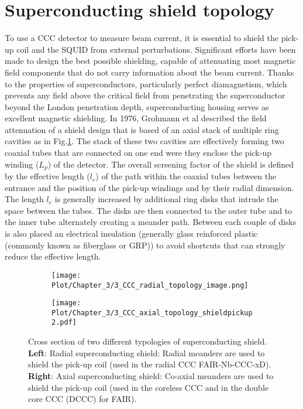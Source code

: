 \documentclass[12pt,a4paper]{report}
\begin{document}
        \section{Superconducting shield topology}
        To use a CCC detector to measure beam current, it is essential to shield the pick-up coil and the SQUID from external perturbations. Significant efforts have been made to design the best possible shielding, capable of attenuating most magnetic field components that do not carry information about the beam current. Thanks to the properties of superconductors, particularly perfect diamagnetism, which prevents any field above the critical field from penetrating the superconductor beyond the London penetration depth, superconducting housing serves as excellent magnetic shielding. In 1976, Grohmann et al \cite{GROHMANN_CCC} described the field attenuation of a shield design that is based of an axial stack of multiple ring cavities as in Fig.\ref{CH3_shield_topology}. The stack of these two cavities are effectively forming two coaxial tubes that are connected on one end were they enclose the pick-up winding ($L_p$) of the detector. The overall screening factor of the shield is defined by the effective length ($l_e$) of the path within the coaxial tubes between the entrance and the position of the pick-up windings and by their radial dimension. The length $l_e$ is generally increased by additional ring disks that intrude the space between the tubes. The disks are then connected to the outer tube and to the inner tube alternately creating a meander path. Between each couple of disks is also placed an electrical insulation (generally glass reinforced plastic (commonly known as fiberglass or GRP)) to avoid shortcuts that can strongly reduce the effective length.
        \begin{figure}[H]
        	\centering
        	\begin{subfigure}[b]{0.45\textwidth}
        		\centering
        		\texttt{[image: Plot/Chapter\_3/3\_CCC\_radial\_topology\_image.png]}
        	\end{subfigure}
        	\hfill
        	\begin{subfigure}[b]{0.45\textwidth}
        		\centering
        		\texttt{[image: Plot/Chapter\_3/3\_CCC\_axial\_topology\_shieldpickup2.pdf]}
        	\end{subfigure}
        	\caption{ Cross section of two different typologies of superconducting shield. \\ \textbf{Left}: Radial superconducting shield: Radial meanders are used to shield the pick-up coil (used in the radial CCC FAIR-Nb-CCC-xD). \\ \textbf{Right}: Axial superconducting shield: Co-axial meanders are used to shield the pick-up coil (used in the coreless CCC and in the double core CCC (DCCC) for FAIR).}
        	\label{CH3_shield_topology}
        \end{figure}
\end{document}
